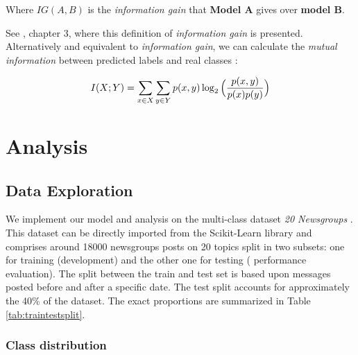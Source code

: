 \documentclass[10pt,journal,compsoc, onecolumn]{IEEEtran}
\begin{document}
Where $ IG(A,B) $ is the \textit{information gain} that \textbf{Model A} gives over \textbf{model B}.

See \cite{Provost}, chapter 3, where this definition of \textit{information gain} is presented. Alternatively and equivalent to \textit{information gain}, we can calculate the \textit{mutual information} between predicted labels and real classes \cite{MI}:

\begin{equation} 
\label{eq:mutualinfo}
    I(X;Y) = \sum_{x \in X} \sum_{y \in Y} p(x,y) \log_2 \Big( {p(x,y) \over  p(x)p(y)} \Big)
\end{equation}


\section{Analysis}
\subsection{Data Exploration}

We implement our model and analysis on the multi-class dataset \textit{20 Newsgroups} \cite{20Newsgroups}. This dataset can be directly imported from the Scikit-Learn \cite{Sklearn} library and comprises around 18000 newsgroups posts on 20 topics split in two subsets: one for training (development) and the other one for testing ( performance evaluation). The split between the train and test set is based upon messages posted before and after a specific date. The test split accounts for approximately the 40\% of the dataset. The exact proportions are summarized in Table \ref{tab:traintestsplit}.

\begin{table}[h]
\caption{20 Newsgroups dataset: number of documents per training and test dataset splits}
\label{tab:traintestsplit}
\begin{center}
\end{center}
\end{table}

\subsubsection{Class distribution}
\end{document}
